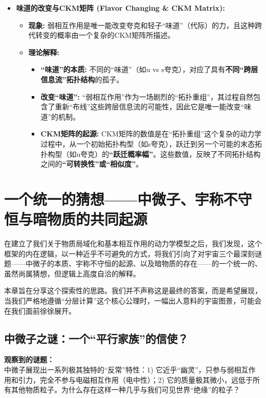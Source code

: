 \documentclass[12pt]{article}
\begin{document}
\begin{itemize}
    \item \textbf{味道的改变与CKM矩阵 (Flavor Changing \& CKM Matrix):}
    \begin{itemize}
        \item \textbf{现象:} 弱相互作用是唯一能改变夸克和轻子``味道''（代际）的力，且这种跨代转变的概率由一个复杂的CKM矩阵所描述。
        \item \textbf{理论解释:}
        \begin{itemize}
            \item \textbf{``味道''的本质:} 不同的``味道''（如u vs s夸克），对应了具有\textbf{不同``跨层信息流''拓扑结构}的孤子。
            \item \textbf{改变``味道'':} ``弱相互作用''作为一场剧烈的``拓扑重组''，其过程自然包含了重新``布线''这些跨层信息流的可能性，因此它是唯一能改变``味道''的机制。
            \item \textbf{CKM矩阵的起源:} CKM矩阵的数值是在``拓扑重组''这个复杂的动力学过程中，从一个初始拓扑构型（如s夸克），跃迁到另一个可能的末态拓扑构型（如u夸克）的\textbf{``跃迁概率幅''}。这些数值，反映了不同拓扑结构之间的\textbf{``可转换性''或``相似度''}。
        \end{itemize}
    \end{itemize}
\end{itemize}

\section{一个统一的猜想——中微子、宇称不守恒与暗物质的共同起源}

在建立了我们关于物质局域化和基本相互作用的动力学模型之后，我们发现，这个框架的内在逻辑，以一种近乎不可避免的方式，将我们引向了对宇宙三个最深刻谜题——中微子的本质、宇称不守恒的起源、以及暗物质的存在——的一个统一的、虽然尚属猜想，但逻辑上高度自洽的解释。

本章旨在分享这个探索性的思路。我们并不声称这是最终的答案，而是希望展现，当我们严格地遵循``分层计算''这个核心公理时，一幅出人意料的宇宙图景，可能会在我们面前徐徐展开。

\subsection{中微子之谜：一个``平行家族''的信使？}

\noindent\textbf{观察到的谜题：}\\
中微子展现出一系列极其独特的``反常''特性：1) 它近乎``幽灵''，只参与弱相互作用和引力，完全不参与电磁相互作用（电中性）；2) 它的质量极其微小，远低于所有其他物质粒子。为什么存在这样一种几乎与我们可见世界``绝缘''的粒子？
\end{document}
